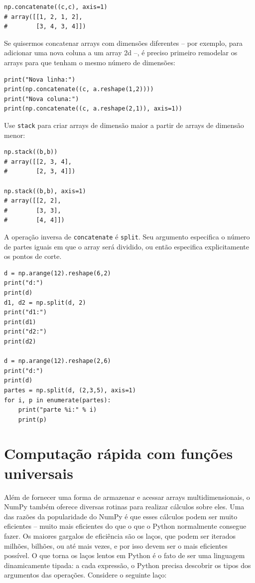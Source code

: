 \documentclass[11pt,a4paper]{article}
\begin{document}
\begin{lstlisting}
np.concatenate((c,c), axis=1)
# array([[1, 2, 1, 2],
#        [3, 4, 3, 4]])
\end{lstlisting}

Se quisermos concatenar arrays com dimensões diferentes -- por exemplo,
para adicionar uma nova coluna a um array 2d --, é preciso primeiro
remodelar os arrays para que tenham o mesmo número de dimensões:

\begin{lstlisting}
print("Nova linha:")
print(np.concatenate((c, a.reshape(1,2))))
print("Nova coluna:")
print(np.concatenate((c, a.reshape(2,1)), axis=1))
\end{lstlisting}

Use \texttt{stack} para criar arrays de dimensão maior a partir de
arrays de dimensão menor:

\begin{lstlisting}
np.stack((b,b))
# array([[2, 3, 4],
#        [2, 3, 4]])

np.stack((b,b), axis=1)
# array([[2, 2],
#        [3, 3],
#        [4, 4]])
\end{lstlisting}

A operação inversa de \texttt{concatenate} é \texttt{split}. Seu
argumento especifica o número de partes iguais em que o array será
dividido, ou então especifica explicitamente os pontos de corte.

\begin{lstlisting}
d = np.arange(12).reshape(6,2)
print("d:")
print(d)
d1, d2 = np.split(d, 2)
print("d1:")
print(d1)
print("d2:")
print(d2)

d = np.arange(12).reshape(2,6)
print("d:")
print(d)
partes = np.split(d, (2,3,5), axis=1)
for i, p in enumerate(partes):
    print("parte %i:" % i)
    print(p)
\end{lstlisting}

\section{Computação rápida com funções universais}

Além de fornecer uma forma de armazenar e acessar arrays
multidimensionais, o NumPy também oferece diversas rotinas para realizar
cálculos sobre eles. Uma das razões da popularidade do NumPy é que esses
cálculos podem ser muito eficientes -- muito mais eficientes do que o
que o Python normalmente consegue fazer. Os maiores gargalos de
eficiência são os laços, que podem ser iterados milhões, bilhões, ou até
mais vezes, e por isso devem ser o mais eficientes possível. O que torna
os laços lentos em Python é o fato de ser uma linguagem dinamicamente
tipada: a cada expressão, o Python precisa descobrir os tipos dos
argumentos das operações. Considere o seguinte laço:
\end{document}
